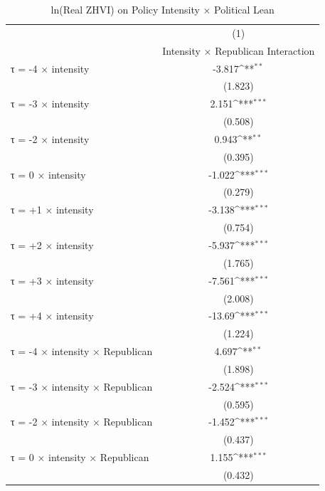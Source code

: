 \begin{table}[htbp]\centering
\def\sym#1{\ifmmode^{#1}\else\(^{#1}\)\fi}
\caption{ln(Real ZHVI) on Policy Intensity × Political Lean}
\begin{tabular}{l*{1}{c}}
\hline\hline
                    &\multicolumn{1}{c}{(1)}\\
                    &\multicolumn{1}{c}{Intensity × Republican Interaction}\\
\hline
τ = -4 × intensity  &      -3.817\sym{**} \\
                    &     (1.823)         \\
[1em]
τ = -3 × intensity  &       2.151\sym{***}\\
                    &     (0.508)         \\
[1em]
τ = -2 × intensity  &       0.943\sym{**} \\
                    &     (0.395)         \\
[1em]
τ = 0 × intensity   &      -1.022\sym{***}\\
                    &     (0.279)         \\
[1em]
τ = +1 × intensity  &      -3.138\sym{***}\\
                    &     (0.754)         \\
[1em]
τ = +2 × intensity  &      -5.937\sym{***}\\
                    &     (1.765)         \\
[1em]
τ = +3 × intensity  &      -7.561\sym{***}\\
                    &     (2.008)         \\
[1em]
τ = +4 × intensity  &      -13.69\sym{***}\\
                    &     (1.224)         \\
[1em]
τ = -4 × intensity × Republican&       4.697\sym{**} \\
                    &     (1.898)         \\
[1em]
τ = -3 × intensity × Republican&      -2.524\sym{***}\\
                    &     (0.595)         \\
[1em]
τ = -2 × intensity × Republican&      -1.452\sym{***}\\
                    &     (0.437)         \\
[1em]
τ = 0 × intensity × Republican&       1.155\sym{***}\\
                    &     (0.432)         \\

\end{tabular}
\end{table}
